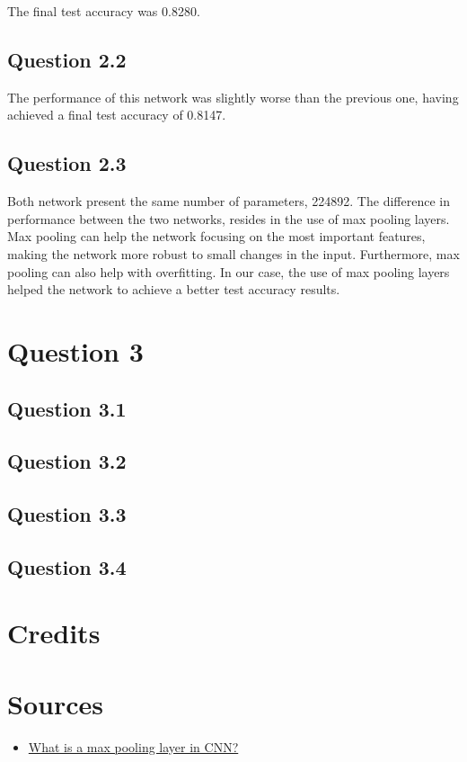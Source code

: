\documentclass{article}
\begin{document}
The final test accuracy was 0.8280.

\subsection{Question 2.2}
The performance of this network was slightly worse than the previous one, 
having achieved a final test accuracy of 0.8147.

\subsection{Question 2.3}
Both network present the same number of parameters, 224892.
The difference in performance between the two networks, resides in the use 
of max pooling layers. Max pooling can help the network focusing on the most
important features, making the network more robust to small changes in the
input. Furthermore, max pooling can also help with overfitting. In our case, 
the use of max pooling layers helped the network to achieve a better test 
accuracy results.

\section{Question 3}

\subsection{Question 3.1}

\subsection{Question 3.2}

\subsection{Question 3.3}

\subsection{Question 3.4}

\section{Credits}

\section{Sources}

\begin{itemize}
    \item \href{https://www.educative.io/answers/what-is-a-max-pooling-layer-in-cnn}{What is a max pooling layer in CNN?}
\end{itemize}
\end{document}
